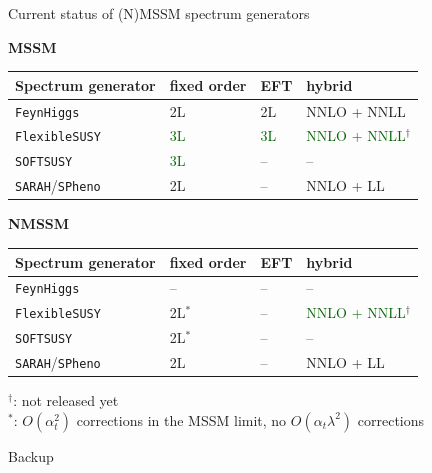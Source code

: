 \documentclass[hyperref={pdfpagelabels=false},ngerman]{beamer}
\renewcommand{\emph}{\textbf}
\newcommand{\FS}{\texttt{FlexibleSUSY}\xspace}
\newcommand{\FH}{\texttt{FeynHiggs}\xspace}
\newcommand{\SPheno}{\texttt{SPheno}\xspace}
\newcommand{\SARAH}{\texttt{SARAH}\xspace}
\newcommand{\SOFTSUSY}{\texttt{SOFTSUSY}\xspace}
\newcommand{\at}{\alpha_t}
\begin{document}
\begin{frame}{Current status of (N)MSSM spectrum generators}
  \begin{center}
    \emph{MSSM}\\[0.4em]
    \begin{tabular}{llll}
      \toprule
      Spectrum generator & fixed order & EFT & hybrid \\
      \midrule
      \FH                & 2L & 2L & NNLO + NNLL \\
      \FS                & \textcolor{darkgreen}{3L} & \textcolor{darkgreen}{3L} & \textcolor{darkgreen}{NNLO + NNLL}$^\dagger$ \\
      \SOFTSUSY          & \textcolor{darkgreen}{3L} & -- & -- \\
      \SARAH/\SPheno     & 2L & -- & NNLO + LL \\
      \bottomrule
    \end{tabular}
  \end{center}
  \begin{center}
    \emph{NMSSM}\\[0.4em]
    \begin{tabular}{llll}
      \toprule
      Spectrum generator & fixed order & EFT & hybrid \\
      \midrule
      \FH                & -- & -- & -- \\
      \FS                & 2L$^*$ & -- & \textcolor{darkgreen}{NNLO + NNLL}$^\dagger$ \\
      \SOFTSUSY          & 2L$^*$ & -- & -- \\
      \SARAH/\SPheno     & 2L & -- & NNLO + LL \\
      \bottomrule
    \end{tabular}
  \end{center}
  $^\dagger$: not released yet\\
  $^*$: $O(\at^2)$ corrections in the MSSM limit, no $O(\at\lambda^2)$ corrections
\end{frame}


\begin{frame}[noframenumbering]
  \begin{center}
    \Huge Backup
  \end{center}
\end{frame}

\end{document}
